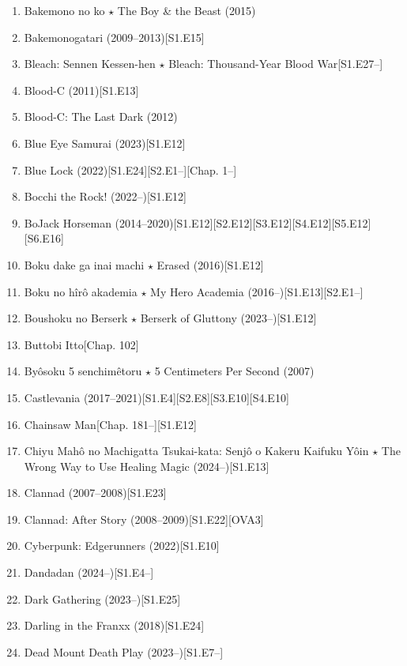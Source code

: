 \documentclass{article}
\begin{document}
\begin{enumerate}
    (2019--2024)\hfill[S1.E13][SP2][S2.E12][SP][S3.E3--]
    \item {\sc Bakemono no ko $\star$ The Boy \& the Beast} (2015)
    \item {\sc Bakemonogatari} (2009--2013)\hfill[S1.E15]
    \item Bleach: Sennen Kessen-hen $\star$ Bleach: Thousand-Year Blood War\hfill[S1.E27--]
    \item {\sc Blood-C} (2011)\hfill[S1.E13]
    \item Blood-C: The Last Dark (2012)
    \item {\sc Blue Eye Samurai} (2023)\hfill[S1.E12]
    \item Blue Lock (2022)\hfill[S1.E24][S2.E1--][Chap. 1--]
    \item Bocchi the Rock! (2022--)\hfill[S1.E12]
    \item {\sc BoJack Horseman} (2014--2020)\hfill[S1.E12][S2.E12][S3.E12][S4.E12][S5.E12][S6.E16]
    \item {\sc Boku dake ga inai machi $\star$ Erased} (2016)\hfill[S1.E12]
    \item Boku no hîrô akademia $\star$ My Hero Academia (2016--)\hfill[S1.E13][S2.E1--]
    \item {\sc Boushoku no Berserk $\star$ Berserk of Gluttony} (2023--)\hfill[S1.E12]
    \item {\sc Buttobi Itto}\hfill[Chap. 102]
    \item {\sc By\^osoku 5 senchimêtoru $\star$ 5 Centimeters Per Second} (2007)
    \item {\sc Castlevania} (2017--2021)\hfill[S1.E4][S2.E8][S3.E10][S4.E10]
    \item {\sc Chainsaw Man}\hfill[Chap. 181--][S1.E12]
    \item {\sc Chiyu Mahô no Machigatta Tsukai-kata: Senjô o Kakeru Kaifuku Yôin $\star$ The Wrong Way to Use Healing Magic} (2024--)[S1.E13]
    \item {\sc Clannad} (2007--2008)\hfill[S1.E23]
    \item {\sc Clannad: After Story} (2008--2009)\hfill[S1.E22][OVA3]
    \item {\sc Cyberpunk: Edgerunners} (2022)\hfill[S1.E10]
    \item Dandadan (2024--)\hfill[S1.E4--]
    \item {\sc Dark Gathering} (2023--)\hfill[S1.E25]
    \item {\sc Darling in the Franxx} (2018)\hfill[S1.E24]
    \item Dead Mount Death Play (2023--)\hfill[S1.E7--]

\end{enumerate}
\end{document}
